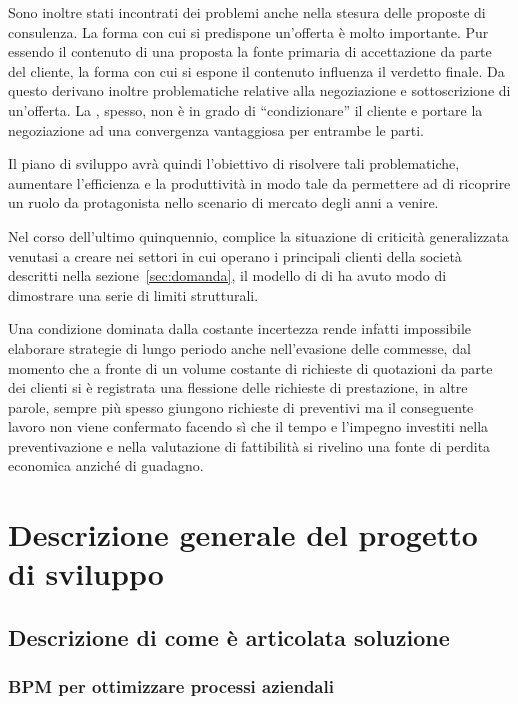 Sono inoltre stati incontrati dei problemi anche nella stesura delle proposte di consulenza. La forma con cui si predispone un'offerta è molto importante. Pur essendo il contenuto di una proposta la fonte primaria di accettazione da parte del cliente, la forma con cui si espone il contenuto influenza il verdetto finale.
Da questo derivano inoltre problematiche relative alla negoziazione e sottoscrizione di un'offerta. La \customer , spesso, non è in grado di ``condizionare'' il cliente e portare la negoziazione ad una convergenza vantaggiosa per entrambe le parti.

Il piano di sviluppo avrà quindi l'obiettivo di risolvere tali problematiche, aumentare l'efficienza e la produttività in modo tale da permettere ad \customer di ricoprire un ruolo da protagonista nello scenario di mercato degli anni a venire.

Nel corso dell'ultimo quinquennio, complice la situazione di criticità generalizzata venutasi a creare nei settori in cui operano i principali clienti della società descritti nella sezione~\ref{sec:domanda}, il modello di \bsn di \customer ha avuto modo di dimostrare una serie di limiti strutturali.

Una condizione dominata dalla costante incertezza rende infatti impossibile elaborare strategie di lungo periodo anche nell'evasione delle commesse, dal momento che a fronte di un volume costante di richieste di quotazioni da parte dei clienti si è registrata una flessione delle richieste di prestazione, in altre parole, sempre più spesso giungono richieste di preventivi ma il conseguente lavoro non viene confermato facendo sì che il tempo e l'impegno investiti nella preventivazione e nella valutazione di fattibilità si rivelino una fonte di perdita economica anziché di guadagno.


\clearpage

\section {Descrizione generale del progetto di sviluppo}
\subsection{Descrizione di come è articolata soluzione}
\subsubsection{BPM per ottimizzare processi aziendali}

